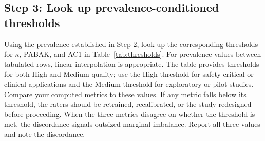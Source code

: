 \documentclass[11pt]{article}
\begin{document}
\subsection*{Step 3: Look up prevalence-conditioned thresholds}

Using the prevalence established in Step 2, look up the corresponding thresholds for $\kappa$, PABAK, and AC1 in Table~\ref{tab:thresholds}. For prevalence values between tabulated rows, linear interpolation is appropriate. The table provides thresholds for both High and Medium quality; use the High threshold for safety-critical or clinical applications and the Medium threshold for exploratory or pilot studies. Compare your computed metrics to these values. If any metric falls below its threshold, the raters should be retrained, recalibrated, or the study redesigned before proceeding. When the three metrics disagree on whether the threshold is met, the discordance signals outsized marginal imbalance. Report all three values and note the discordance.
\end{document}
